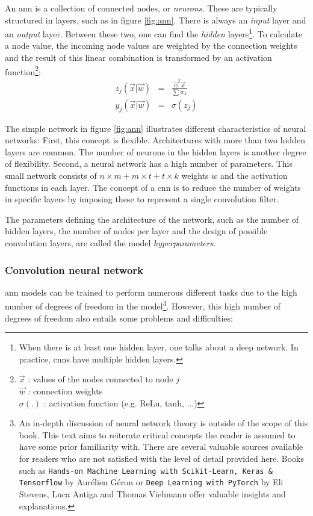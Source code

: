 \par{
    An \acrshort{ann} is a collection of connected nodes, or \textit{neurons}. 
    These are typically structured in layers, such as in figure \ref{fig:ann}. 
    There is always an \textit{input} layer and an \textit{output} layer. Between these two, one can find the \textit{hidden} layers\footnote{When there is at least one hidden layer, one talks about a deep network. In practice, \acrshort{cnn}s have multiple hidden layers.}.
    To calculate a node value, the incoming node values are weighted by the connection weights and the result of this linear combination is transformed by an activation function\footnote{
        $\vec{x}$ : values of the nodes connected to node $j$\\
        $\vec{w}$ : connection weights\\
        $\sigma(.)$ : activation function (e.g. ReLu, tanh, ...)
    }:
    \begin{eqnarray}
        z_j(\vec{x} | \vec{w}) &=& \frac{\vec{w}^T\vec{x}}{\sum w_k} \\
        y_j(\vec{x} | \vec{w}) &=& \sigma(z_j)
    \end{eqnarray}

}
\par{
    The simple network in figure \ref{fig:ann} illustrates different characteristics of neural networks: 
    First, this concept is flexible.
    Architectures with more than two hidden layers are common. 
    The number of neurons in the hidden layers is another degree of flexibility. 
    Second, a neural network has a high number of parameters. This small network consists of $n\times m + m \times t + t \times k$ weights $w$ and the activation functions in each layer.
    The concept of a \acrfull{cnn} is to reduce the number of weights in specific layers by imposing these to represent a single convolution filter.
}
\par{
    The parameters defining the architecture of the network, such as the number of hidden layers, the number of nodes per layer and the design of possible convolution layers, are called the model \textit{hyperparameters}.
}


\subsubsection{Convolution neural network}

\acrshort{ann} models can be trained to perform numerous different tasks due to the high number of degrees of freedom in the model\footnote{
    An in-depth discussion of neural network theory is outside of the scope of this book.
    This text aims to reiterate critical concepts the reader is assumed to have some prior familiarity with.
    There are several valuable sources available for readers who are not satisfied with the level of detail provided here.
    Books such as \texttt{Hands-on Machine Learning with Scikit-Learn, Keras \& Tensorflow} by Aurélien Géron or \texttt{Deep Learning with PyTorch} by Eli Stevens, Luca Antiga and Thomas Viehmann offer valuable insights and explanations.
}.
However, this high number of degrees of freedom also entails some problems and difficulties:

